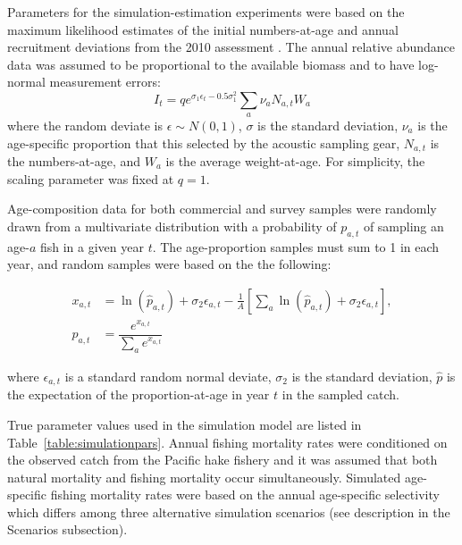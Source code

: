 \documentclass[review,letterpaper,10pt,authoryear]{elsarticle}
\begin{document}
Parameters for the simulation-estimation experiments were based on the maximum likelihood estimates of the initial numbers-at-age and annual recruitment deviations from the 2010 assessment  \citep{Martell2009}. The annual relative abundance data was assumed to be proportional to the available biomass and to have log-normal measurement errors:
\begin{equation}\label{eq:surveyIndex}
	I_t = q e^{\sigma_1\epsilon_t - 0.5\sigma_1^2} \sum_a \nu_a N_{a,t}  W_a 
\end{equation}
where the random deviate is $\epsilon \sim N(0,1)$, $\sigma$ is the standard deviation, $\nu_a$ is the age-specific proportion that this selected by the acoustic sampling gear, $N_{a,t}$ is the numbers-at-age, and $W_a$ is the average weight-at-age.  For simplicity, the scaling parameter was fixed at $q=1$.

Age-composition data for both commercial and survey samples were randomly drawn from a multivariate distribution with a probability of $p_{a,t}$ of sampling an age-$a$ fish in a given year $t$.  The age-proportion samples must sum to 1 in each year, and random samples were based on the the following:

\begin{align}
	x_{a,t} &= \ln(\hat{p}_{a,t}) + \sigma_2 \epsilon_{a,t} - \frac{1}{A}
	\left[\sum_a \ln(\hat{p}_{a,t}) + \sigma_2 \epsilon_{a,t} \right],\nonumber \\ 
	p_{a,t} &= \dfrac{e^{x_{a,t}}}{\sum_{a} e^{x_{a,t}} } \label{eq:ageProportion}
\end{align}

where $\epsilon_{a,t}$ is a standard random normal deviate, $\sigma_2$ is the standard deviation, $\hat{p}$ is the expectation of the proportion-at-age in year $t$ in the sampled catch.

True parameter values used in the simulation model are listed in Table~\ref{table:simulationpars}.  Annual fishing mortality rates were conditioned on the observed catch from the Pacific hake fishery and it was assumed that both natural mortality and fishing mortality occur simultaneously.  Simulated age-specific fishing mortality rates were based on the annual age-specific selectivity which differs among three alternative simulation scenarios (see description in the Scenarios subsection).
\end{document}
